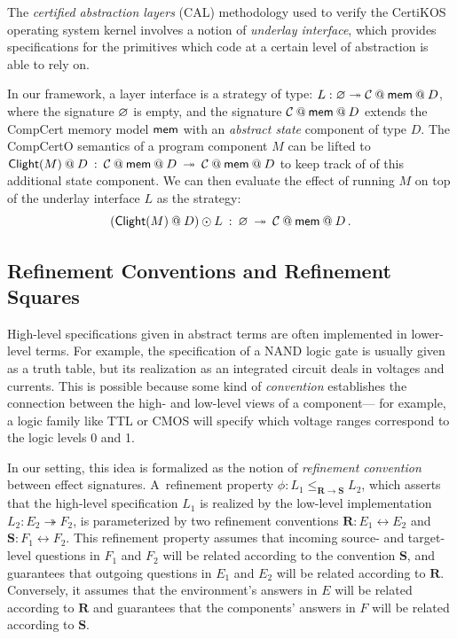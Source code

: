 \begin{example} \label{ex:calcomp} %
The \emph{certified abstraction layers} (CAL) methodology used to verify
the CertiKOS operating system kernel \cite{dscal15}
involves a notion of \emph{underlay interface},
which provides specifications for the primitives which
code at a certain level of abstraction is able to rely on.

In our framework, a layer interface is a strategy of type:
$
  L : \emptysig \twoheadrightarrow \mathcal{C} \mathbin@ \kw{mem} \mathbin@ D
$,
where the signature $\varnothing$ is empty,
and the signature $\mathcal{C} \mathbin@ \kw{mem} \mathbin@ D$
extends the CompCert memory model $ \mathsf{mem} $
with an \emph{abstract state} component of type $D$.
The CompCertO semantics of a program component $M$ can be lifted to
$
  \kw{Clight}(M) \mathbin@ D \: : \:
    \mathcal{C} \mathbin@ \kw{mem} \mathbin@ D \: \twoheadrightarrow \:
    \mathcal{C} \mathbin@ \kw{mem} \mathbin@ D
$
to keep track of of this additional state component. 
We can then evaluate the effect of running $M$
on top of the underlay interface $L$ as the strategy:
\[
  (\kw{Clight}(M) \mathbin@ D) \odot L \: : \:
    \emptysig \: \twoheadrightarrow \:
    \mathcal{C} \mathbin@ \kw{mem} \mathbin@ D
    \,.
\]
\end{example}


\subsection{Refinement Conventions and Refinement Squares} \label{sec:sconv} %

High-level specifications given in abstract terms
are often implemented in lower-level terms.
For example, the specification of a NAND logic gate
is usually given as a truth table,
but its realization as an integrated circuit
deals in voltages and currents.
This is possible because some kind of \emph{convention}
establishes the connection between
the high- and low-level views of a component---%
for example, a logic family like TTL or CMOS
will specify which voltage ranges correspond
to the logic levels 0 and 1.

In our setting, this idea is formalized
as the notion of \emph{refinement convention} between effect signatures.
A~refinement property
$\phi : L_1 \le_{\mathbf{R} \rightarrow \mathbf{S}} L_2$,
which asserts that the high-level specification $L_1$
is realized by the low-level implementation $L_2 : E_2 \twoheadrightarrow F_2$,
is parameterized by two refinement conventions
$\mathbf{R} : E_1 \leftrightarrow E_2$ and
$\mathbf{S} : F_1 \leftrightarrow F_2$.
This refinement property assumes that incoming
source- and target-level questions in $F_1$ and $F_2$
will be related according to the convention $\mathbf{S}$,
and guarantees that outgoing questions in $E_1$ and $E_2$
will be related according to $\mathbf{R}$.
Conversely, it assumes that
the environment's answers in $E$
will be related according to $\mathbf{R}$
and guarantees that the components' answers in $F$
will be related according to $\mathbf{S}$.

